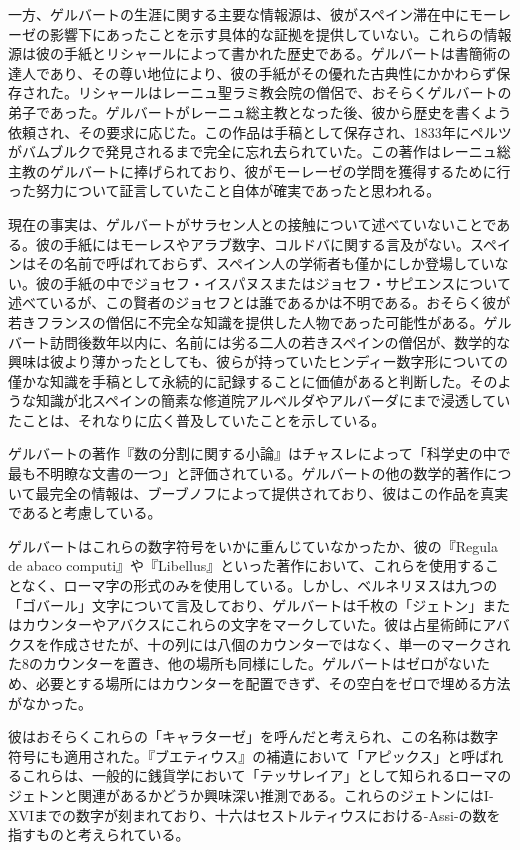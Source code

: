 \documentclass[a4paper,11pt,openany]{ltjsbook}
\begin{document}
一方、ゲルバートの生涯に関する主要な情報源は、彼がスペイン滞在中にモーレーゼの影響下にあったことを示す具体的な証拠を提供していない。これらの情報源は彼の手紙とリシャールによって書かれた歴史である。ゲルバートは書簡術の達人であり、その尊い地位により、彼の手紙がその優れた古典性にかかわらず保存された。リシャールはレーニュ聖ラミ教会院の僧侶で、おそらくゲルバートの弟子であった。ゲルバートがレーニュ総主教となった後、彼から歴史を書くよう依頼され、その要求に応じた。この作品は手稿として保存され、1833年にペルツがバムブルクで発見されるまで完全に忘れ去られていた。この著作はレーニュ総主教のゲルバートに捧げられており、彼がモーレーゼの学問を獲得するために行った努力について証言していたこと自体が確実であったと思われる。

現在の事実は、ゲルバートがサラセン人との接触について述べていないことである。彼の手紙にはモーレスやアラブ数字、コルドバに関する言及がない。スペインはその名前で呼ばれておらず、スペイン人の学術者も僅かにしか登場していない。彼の手紙の中でジョセフ・イスパヌスまたはジョセフ・サピエンスについて述べているが、この賢者のジョセフとは誰であるかは不明である。おそらく彼が若きフランスの僧侶に不完全な知識を提供した人物であった可能性がある。ゲルバート訪問後数年以内に、名前には劣る二人の若きスペインの僧侶が、数学的な興味は彼より薄かったとしても、彼らが持っていたヒンディー数字形についての僅かな知識を手稿として永続的に記録することに価値があると判断した。そのような知識が北スペインの簡素な修道院アルベルダやアルバーダにまで浸透していたことは、それなりに広く普及していたことを示している。

ゲルバートの著作『数の分割に関する小論』はチャスレによって「科学史の中で最も不明瞭な文書の一つ」と評価されている。ゲルバートの他の数学的著作について最完全の情報は、ブーブノフによって提供されており、彼はこの作品を真実であると考慮している。

ゲルバートはこれらの数字符号をいかに重んじていなかったか、彼の『Regula de abaco computi』や『Libellus』といった著作において、これらを使用することなく、ローマ字の形式のみを使用している。しかし、ベルネリヌスは九つの「ゴバール」文字について言及しており、ゲルバートは千枚の「ジェトン」またはカウンターやアバクスにこれらの文字をマークしていた。彼は占星術師にアバクスを作成させたが、十の列には八個のカウンターではなく、単一のマークされた8のカウンターを置き、他の場所も同様にした。ゲルバートはゼロがないため、必要とする場所にはカウンターを配置できず、その空白をゼロで埋める方法がなかった。

彼はおそらくこれらの「キャラターゼ」を呼んだと考えられ、この名称は数字符号にも適用された。『ブエティウス』の補遺において「アピックス」と呼ばれるこれらは、一般的に銭貨学において「テッサレイア」として知られるローマのジェトンと関連があるかどうか興味深い推測である。これらのジェトンにはI-XVIまでの数字が刻まれており、十六はセストルティウスにおける-Assi-の数を指すものと考えられている。
\end{document}
